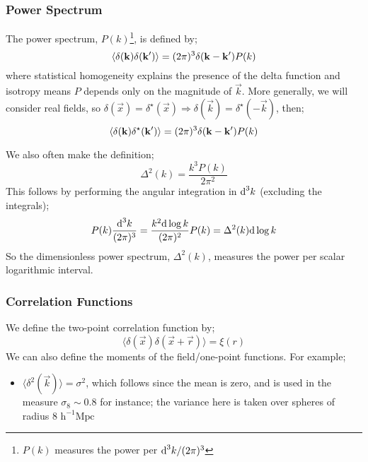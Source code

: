 \subsubsection{Power Spectrum}
The power spectrum, $P(k)$\footnote{$P(k)$ measures the power per $\text{d}^3 k/(2\pi)^3$}, is defined by;
\begin{equation}
\langle \delta(\mathbf k) \delta(\mathbf k^{\prime}) \rangle = (2\pi)^3 \delta(\mathbf k - \mathbf k^{\prime})P(k)
\end{equation}
where statistical homogeneity explains the presence of the delta function and isotropy means $P$ depends only on the magnitude of $\vec k$. More generally, we will consider real fields, so $\delta(\vec x) = \delta^{\star}(\vec x) \Rightarrow \delta(\vec k) = \delta^{\star}(- \vec k)$, then;
\begin{equation}
\langle \delta(\mathbf k) \delta^{\star}(\mathbf k^{\prime}) \rangle = (2\pi)^3 \delta(\mathbf k - \mathbf k^{\prime})P(k)
\end{equation}
\begin{definitionbox}
We also often make the definition;
\begin{equation}
\Delta^2 (k) = \frac{k^3 P(k)}{2\pi^2}
\end{equation}
This follows by performing the angular integration in $\text{d}^3 k$ (excluding the integrals);
\begin{equation}
P(k)\frac{\text{d}^3 k}{(2\pi)^3} = \frac{k^2 \text{d} \log k}{(2\pi)^2}P(k) = \Delta^2(k) \text{d} \log k
\end{equation}
So the dimensionless power spectrum, $\Delta^2(k)$, measures the power per scalar logarithmic interval.
\end{definitionbox}
\subsubsection{Correlation Functions}
We define the two-point correlation function by;\footnotemark
{}
\begin{equation}
\langle \delta(\vec x)\delta(\vec x + \vec r) \rangle = \xi(r)
\end{equation}
We can also define the moments of the field/one-point functions. For example;
\begin{itemize}
\item $\langle \delta^2 (\vec k) \rangle = \sigma^2$, which follows since the mean is zero, and is used in the measure $\sigma_8 \sim 0.8$ for instance; the variance here is taken over spheres of radius $8 \,\, \text{h}^{-1}\text{Mpc}$
\end{itemize}
